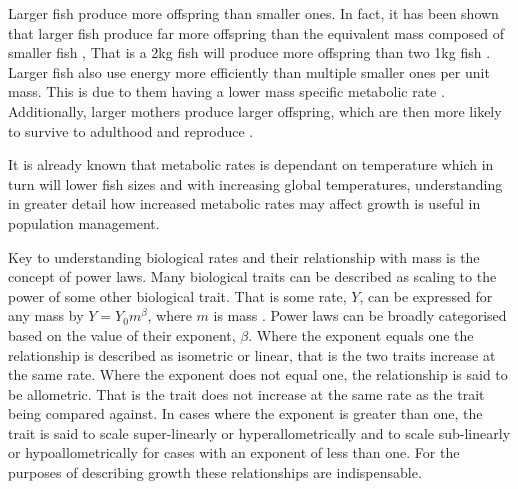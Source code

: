 \documentclass[a4paper, 11pt, hidelinks]{article} %
\begin{document}
	Larger fish produce more offspring than smaller ones.  %
	In fact, it has been shown that larger fish produce far more offspring than the equivalent mass composed of smaller fish ,  That is a 2kg fish will produce more offspring than two 1kg fish \parencite{Barneche2018}.
	Larger fish also use energy more efficiently than multiple smaller ones per unit mass.  This is due to them having a lower mass specific metabolic rate \parencite{Peters1983, Kleiber1932, Brown2004}.  
	Additionally, larger mothers produce larger offspring, which are then more likely to survive to adulthood and reproduce \parencite{Hixon2014, Marshall2006}. %
	
	It is already known that metabolic rates is dependant on temperature which in turn will lower fish sizes \parencite{Gillooly2001, Brown2004} and with increasing global temperatures, understanding in greater detail how increased metabolic rates may affect growth is useful in population management.
	
	
	Key to understanding biological rates and their relationship with mass is the concept of power laws. Many biological traits can be described as scaling to the power of some other biological trait.  That is some rate, $Y$, can be expressed for any mass by $Y = Y_0 m^\beta$, where $m$ is mass \parencite{Kleiber1932}.  Power laws can be broadly categorised based on the value of their exponent, $\beta$.  
	Where the exponent equals one the relationship is described as isometric or linear, that is the two traits increase at the same rate.  
	Where the exponent does not equal one, the relationship is said to be allometric.  That is the trait does not increase at the same rate as the trait being compared against.  In cases where the exponent is greater than one, the trait is said to scale super-linearly or hyperallometrically and to scale sub-linearly or hypoallometrically for cases with an exponent of less than one.
	For the purposes of describing growth these relationships are indispensable.   
	
\end{document}
